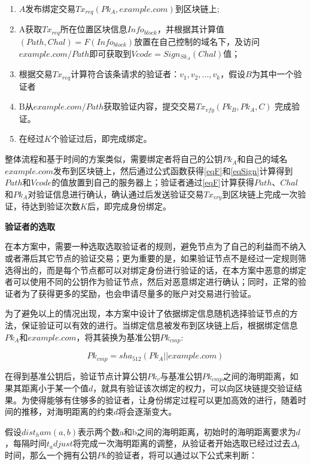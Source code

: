 \begin{enumerate}
	\item $A$发布绑定交易$Tx_{req}(Pk_A, example.com)$到区块链上;
	\item  A获取$Tx_{req}$所在位置区块信息$Info_{block}$，并根据其计算值$(Path, Chal) = F(Info_{block})$放置在自己控制的域名下，及访问$example.com/Path$即可获取到$Vcode = Sign_{Sk_A}(Chal)$值；
	\item 根据交易$Tx_{req}$计算符合该条请求的验证者：${v_1, v_2, ... , v_k}$，假设$B$为其中一个验证者
	\item B从$example.com/Path$获取验证内容，提交交易$Tx_{vfy}(Pk_B, Pk_A, C)$ 完成验证。
	\item 在经过$K$个验证过后，即完成绑定。
\end{enumerate}

整体流程和基于时间的方案类似，需要绑定者将自己的公钥$Pk_A$和自己的域名$example.com$发布到区块链上，然后通过公式函数获得\eqref{eqF}和\eqref{eqSign}计算得到$Path$和$Vcode$的值放置到自己的服务器上；验证者通过\eqref{eqF}计算获得$Path$、$Chal$和$Pk_A$对验证信息进行确认，确认通过后发送验证交易$Tx_{vry}$到区块链上完成一次验证，待达到验证次数$K$后，即完成身份绑定。

\noindent\textbf{验证者的选取}

在本方案中，需要一种选取选取验证者的规则，避免节点为了自己的利益而不纳入或者滞后其它节点的验证交易；更为重要的是，如果验证节点不是经过一定规则筛选得出的，而是每个节点都可以对绑定身份进行验证的话，在本方案中恶意的绑定者可以使用不同的公钥作为验证节点，然后对恶意绑定进行确认；同时，正常的验证者为了获得更多的奖励，也会申请尽量多的账户对交易进行验证。

为了避免以上的情况出现，本方案中设计了依据绑定信息随机选择验证节点的方法，保证验证可以有效的进行。当绑定信息被发布到区块链上后，根据绑定信息$Pk_A$和$example.com$，将其装换为基准公钥$Pk_{cmp}$:

\begin{equation}\label{eqGenCmpPk}
Pk_{cmp} = sha_{512}(Pk_A||example.com)
\end{equation}

在得到基准公钥后，验证节点计算公钥$Pk_v$与基准公钥$Pk_{cmp}$之间的海明距离，如果其距离小于某一个值$d$，就具有验证该次绑定的权力，可以向区块链提交验证结果。为使得能够有住够多的验证者，让身份绑定过程可以更加高效的进行，随着时间的推移，对海明距离的约束$d$将会逐渐变大。

假设$dist_ham(a,b)$表示两个数a和b之间的海明距离，初始时的海明距离要求为$d$，每隔时间$t_adjust$将完成一次海明距离的调整，从验证者开始选取已经过过去$\Delta_t$时间，那么一个拥有公钥$Pk$的验证者，将可以通过以下公式来判断：


